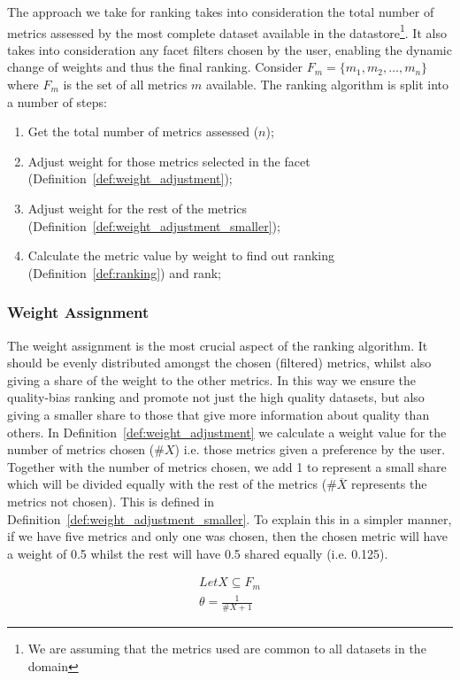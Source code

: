 The approach we take for ranking takes into consideration the total number of metrics assessed by the most complete dataset available in the datastore\footnote{We are assuming that the metrics used are common to all datasets in the domain}.
It also takes into consideration any facet filters chosen by the user, enabling the dynamic change of weights and thus the final ranking.
Consider $F_{m} = \lbrace m_{1},m_{2},\dots,m_{n} \rbrace$ where $F_{m}$ is the set of all metrics $m$ available.
The ranking algorithm is split into a number of steps:
\begin{enumerate}
\item Get the total number of metrics assessed ($n$);
\item Adjust weight for those metrics selected in the facet (Definition~\ref{def:weight_adjustment});
\item Adjust weight for the rest of the metrics (Definition~\ref{def:weight_adjustment_smaller});
\item Calculate the metric value by weight to find out ranking (Definition~\ref{def:ranking}) and rank;
\end{enumerate}

\subsubsection{Weight Assignment}
The weight assignment is the most crucial aspect of the ranking algorithm.
It should be evenly distributed amongst the chosen (filtered) metrics, whilst also giving a share of the weight to the other metrics.
In this way we ensure the quality-bias ranking and promote not just the high quality datasets, but also giving a smaller share to those that give more information about quality than others.
In Definition~\ref{def:weight_adjustment} we calculate a weight value for the number of metrics chosen ($\#X$) i.e. those metrics given a preference by the user.
Together with the number of metrics chosen, we add 1 to represent a small share which will be divided equally with the rest of the metrics ($\#\overline{X}$ represents the metrics not chosen).
This is defined in Definition~\ref{def:weight_adjustment_smaller}.
To explain this in a simpler manner, if we have five metrics and only one was chosen, then the chosen metric will have a weight of 0.5 whilst the rest will have 0.5 shared equally (i.e. 0.125).

\begin{Def1}
\label{def:weight_adjustment}
\begin{align*}
\mathit{Let} X \subseteq F_{m} \\
\theta = \frac{1}{\#X + 1}
\end{align*}
\end{Def1}

